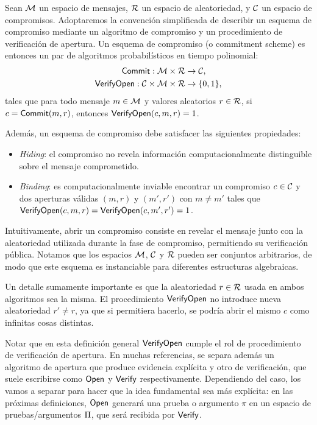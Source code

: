 \begin{definition}
\label{def:apendice-b-commitment-schemes-esquema-de-compromiso}
	Sean $\mathcal{M}$ un espacio de mensajes, $\mathcal{R}$ un espacio de aleatoriedad, y $\mathcal{C}$ un espacio de compromisos. Adoptaremos la convención simplificada de describir un esquema de compromiso mediante un algoritmo de compromiso y un procedimiento de verificación de apertura. Un esquema de compromiso (o commitment scheme) es entonces un par de algoritmos probabilísticos en tiempo polinomial:
	$$\begin{aligned}
		\mathsf{Commit}: \mathcal{M} \times \mathcal{R} &\to \mathcal{C}, \\
		\mathsf{VerifyOpen}: \mathcal{C} \times \mathcal{M} \times \mathcal{R} &\to \{0,1\},
	\end{aligned}$$
	tales que para todo mensaje $m \in \mathcal{M}$ y valores aleatorios $r \in \mathcal{R}$, si $c = \mathsf{Commit}(m,r)$, entonces $\mathsf{VerifyOpen}(c,m,r) = 1$.
	
	Además, un esquema de compromiso debe satisfacer las siguientes propiedades:
	\begin{itemize}[noitemsep]
			\item \textit{Hiding}: el compromiso no revela información computacionalmente distinguible sobre el mensaje comprometido.
			\item \textit{Binding}: es computacionalmente inviable encontrar un compromiso $c \in \mathcal{C}$ y dos aperturas válidas $(m,r)$ y $(m',r')$ con $m \neq m'$ tales que $\mathsf{VerifyOpen}(c,m,r) = \mathsf{VerifyOpen}(c,m',r') = 1$.
	\end{itemize}
\end{definition}

Intuitivamente, abrir un compromiso consiste en revelar el mensaje junto con la aleatoriedad utilizada durante la fase de compromiso, permitiendo su verificación pública. Notamos que los espacios $\mathcal{M}$, $\mathcal{C}$ y $\mathcal{R}$ pueden ser conjuntos arbitrarios, de modo que este esquema es instanciable para diferentes estructuras algebraicas.

Un detalle sumamente importante es que la aleatoriedad $r \in \mathcal{R}$ usada en ambos algoritmos sea la misma. El procedimiento $\mathsf{VerifyOpen}$ no introduce nueva aleatoriedad $r' \neq r$, ya que si permitiera hacerlo, se podría abrir el mismo $c$ como infinitas cosas distintas.

Notar que en esta definición general $\mathsf{VerifyOpen}$ cumple el rol de procedimiento de verificación de apertura. En muchas referencias, se separa además un algoritmo de apertura que produce evidencia explícita y otro de verificación, que suele escribirse como $\mathsf{Open}$ y $\mathsf{Verify}$ respectivamente. Dependiendo del caso, los vamos a separar para hacer que la idea fundamental sea más explícita: en las próximas definiciones, $\mathsf{Open}$ generará una prueba o argumento $\pi$ en un espacio de pruebas/argumentos $\Pi$, que será recibida por $\mathsf{Verify}$.

